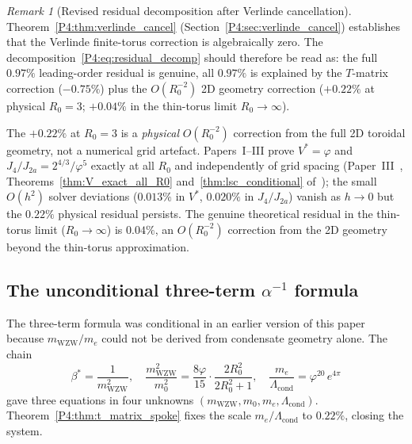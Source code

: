 \documentclass[11pt,a4paper]{article}
\theoremstyle{definition}
\theoremstyle{remark}
\newtheorem{remark}[theorem]{Remark}
\newcommand{\vp}{\varphi}
\newcommand{\bst}{\beta^{*}}
\newcommand{\Lcond}{\Lambda_{\mathrm{cond}}}
\newcommand{\mWZW}{m_{\mathrm{WZW}}}
\begin{document}
\begin{remark}[Revised residual decomposition after Verlinde cancellation]
\label{P4:rem:revised_decomp}
Theorem~\ref{P4:thm:verlinde_cancel} (Section~\ref{P4:sec:verlinde_cancel})
establishes that the Verlinde finite-torus correction is algebraically zero.
The decomposition~\eqref{P4:eq:residual_decomp} should therefore be read as:
the full $0.97\%$ leading-order residual is genuine, all $0.97\%$ is
explained by the $T$-matrix correction ($-0.75\%$) plus the $O(R_0^{-2})$
2D geometry correction ($+0.22\%$ at physical $R_0=3$; $+0.04\%$
in the thin-torus limit $R_0\to\infty$).

The $+0.22\%$ at $R_0=3$ is a \emph{physical} $O(R_0^{-2})$ correction
from the full 2D toroidal geometry, not a numerical grid artefact.
Papers~I--III prove $V^*=\vp$ and $J_4/J_{2a}=2^{4/3}/\vp^5$ exactly at
all $R_0$ and independently of grid spacing
(Paper~III~\cite{Paper3}, Theorems~\ref{thm:V_exact_all_R0} and~\ref{thm:lsc_conditional}
of~\cite{Paper3}); the small $O(h^2)$ solver deviations ($0.013\%$ in
$V^*$, $0.020\%$ in $J_4/J_{2a}$) vanish as $h\to0$ but the $0.22\%$
physical residual persists.
The genuine theoretical residual in the thin-torus limit ($R_0\to\infty$)
is $0.04\%$, an $O(R_0^{-2})$ correction from the 2D geometry beyond
the thin-torus approximation.
\end{remark}

\subsection{The unconditional three-term $\alpha^{-1}$ formula}
\label{P4:sec:unconditional_alpha}

The three-term formula was conditional in an earlier version of this paper
because $\mWZW/m_e$ could not be derived from condensate geometry alone.
The chain
\begin{equation}
  \bst = \frac{1}{\mWZW^2},
  \quad
  \frac{\mWZW^2}{m_0^2} = \frac{8\vp}{15}\cdot\frac{2R_0^2}{2R_0^2+1},
  \quad
  \frac{m_e}{\Lcond} = \vp^{20}\,e^{4\pi}
  \label{P4:eq:old_chain_3eqs}
\end{equation}
gave three equations in four unknowns $(\mWZW,m_0,m_e,\Lcond)$.
Theorem~\ref{P4:thm:t_matrix_spoke} fixes the scale $m_e/\Lcond$ to $0.22\%$,
closing the system.
\end{document}
